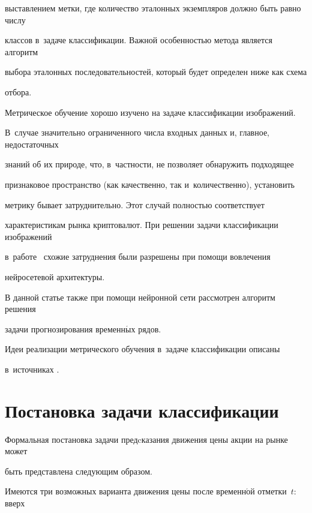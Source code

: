 выставлением метки, где количество эталонных экземпляров должно быть равно чис\-лу 

классов в~задаче классификации. Важной осо\-бен\-ностью метода является алгоритм 

выбора эталонных последовательностей, который будет определен ниже как схема 

отбора.



Метрическое обучение хорошо изучено на задаче классификации изображений. 

В~случае значительно ограниченного числа входных данных и, главное, недостаточных 

знаний об их природе, что, в~част\-ности, не позволяет обнаружить подходящее 

признаковое пространство (как качественно, так и~количественно), установить 

метрику бывает затруднительно. Этот случай полностью соответствует 

характеристикам рынка криптовалют. При решении задачи классификации изображений 

в~работе~\cite{images} схожие затруднения были разрешены при помощи вовлечения 

нейросетевой архитектуры.

В данной статье также при помощи нейронной сети рассмотрен алгоритм решения 

задачи прогнозирования временн$\acute{\mbox{ы}}$х рядов.



Идеи реализации метрического обучения в~задаче классификации описаны 

в~источниках \cite{implementation1, implementation2}.







\section{Постановка задачи классификации}



Формальная постановка задачи предcказания движения цены акции на рынке может 

быть представлена следующим образом.



Имеются три возможных варианта движения цены после временн$\acute{\mbox{о}}$й отметки~$t$: вверх 


